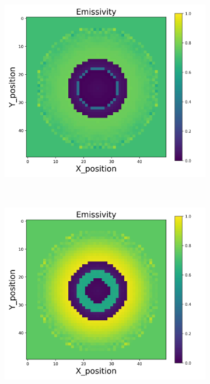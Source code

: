 {\begin{figure}[p]
\begin{minipage}{\textwidth}
\begin{subfigure}{0.325\textwidth}
        \end{subfigure}
        \begin{subfigure}{0.325\textwidth}
            \centering
            \includegraphics[width=\textwidth]{figures/raw_data/21/quad/emi_cal.jpg}
        \end{subfigure}
    \end{minipage}\\
    \begin{minipage}{\textwidth}
        \centering
        \begin{subfigure}{0.325\textwidth}
            \centering
            \includegraphics[width=\textwidth]{figures/raw_data/22/quad/emi_cal.jpg}

\end{subfigure}
\end{minipage}
\end{figure}}

